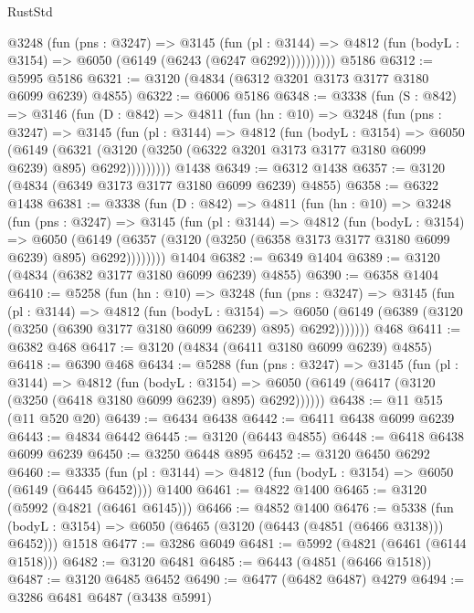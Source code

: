 \begin{lexlean}{RustStd}
\begin{coremodule}
          @3248
            (fun (pns : @3247) =>
            @3145
              (fun (pl : @3144) =>
              @4812 (fun (bodyL : @3154) => @6050 (@6149 (@6243 (@6247 @6292))))))))))
    @5186
@6312 := @5995 @5186
@6321 := @3120 (@4834 (@6312 @3201 @3173 @3177 @3180 @6099 @6239) @4855)
@6322 := @6006 @5186
@6348 := @3338
    (fun (S : @842) =>
    @3146
      (fun (D : @842) =>
      @4811
        (fun (hn : @10) =>
        @3248
          (fun (pns : @3247) =>
          @3145
            (fun (pl : @3144) =>
            @4812
              (fun (bodyL : @3154) =>
              @6050
                (@6149
                  (@6321
                    (@3120 (@3250 (@6322 @3201 @3173 @3177 @3180 @6099 @6239) @895) @6292)))))))))
    @1438
@6349 := @6312 @1438
@6357 := @3120 (@4834 (@6349 @3173 @3177 @3180 @6099 @6239) @4855)
@6358 := @6322 @1438
@6381 := @3338
    (fun (D : @842) =>
    @4811
      (fun (hn : @10) =>
      @3248
        (fun (pns : @3247) =>
        @3145
          (fun (pl : @3144) =>
          @4812
            (fun (bodyL : @3154) =>
            @6050
              (@6149 (@6357 (@3120 (@3250 (@6358 @3173 @3177 @3180 @6099 @6239) @895) @6292))))))))
    @1404
@6382 := @6349 @1404
@6389 := @3120 (@4834 (@6382 @3177 @3180 @6099 @6239) @4855)
@6390 := @6358 @1404
@6410 := @5258
    (fun (hn : @10) =>
    @3248
      (fun (pns : @3247) =>
      @3145
        (fun (pl : @3144) =>
        @4812
          (fun (bodyL : @3154) =>
          @6050 (@6149 (@6389 (@3120 (@3250 (@6390 @3177 @3180 @6099 @6239) @895) @6292)))))))
    @468
@6411 := @6382 @468
@6417 := @3120 (@4834 (@6411 @3180 @6099 @6239) @4855)
@6418 := @6390 @468
@6434 := @5288
    (fun (pns : @3247) =>
    @3145
      (fun (pl : @3144) =>
      @4812
        (fun (bodyL : @3154) =>
        @6050 (@6149 (@6417 (@3120 (@3250 (@6418 @3180 @6099 @6239) @895) @6292))))))
@6438 := @11 @515 (@11 @520 @20)
@6439 := @6434 @6438
@6442 := @6411 @6438 @6099 @6239
@6443 := @4834 @6442
@6445 := @3120 (@6443 @4855)
@6448 := @6418 @6438 @6099 @6239
@6450 := @3250 @6448 @895
@6452 := @3120 @6450 @6292
@6460 := @3335
    (fun (pl : @3144) => @4812 (fun (bodyL : @3154) => @6050 (@6149 (@6445 @6452))))
    @1400
@6461 := @4822 @1400
@6465 := @3120 (@5992 (@4821 (@6461 @6145)))
@6466 := @4852 @1400
@6476 := @5338
    (fun (bodyL : @3154) => @6050 (@6465 (@3120 (@6443 (@4851 (@6466 @3138))) @6452)))
    @1518
@6477 := @3286 @6049
@6481 := @5992 (@4821 (@6461 (@6144 @1518)))
@6482 := @3120 @6481
@6485 := @6443 (@4851 (@6466 @1518))
@6487 := @3120 @6485 @6452
@6490 := @6477 (@6482 @6487) @4279
@6494 := @3286 @6481 @6487 (@3438 @5991)

\end{coremodule}
\end{lexlean}
